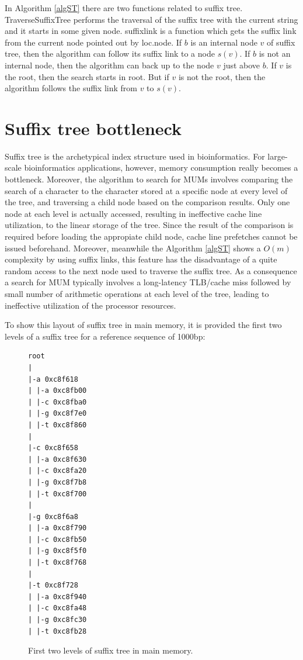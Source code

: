 \documentclass[conference]{IEEEtran}
\begin{document}
In Algorithm \ref{algST} there are two functions related to suffix tree. TraverseSuffixTree performs the traversal of the suffix tree with the current string  and it starts in some given node. suffixlink is a function which gets the suffix link from the current node pointed out by loc.node. If $b$ is an internal node $v$ of suffix tree, then the algorithm can follow its suffix link to a node $s(v)$. If $b$ is not an internal node, then the algorithm can back up to the node $v$ just above $b$. If $v$ is the root, then the search starts in root. But if $v$ is not the root, then the algorithm follows the suffix link from $v$ to $s(v)$.
\section{Suffix tree bottleneck}
Suffix tree is the archetypical index structure used in bioinformatics. For large-scale bioinformatics applications, however, memory consumption really becomes a bottleneck. Moreover, the algorithm to search for MUMs involves comparing the search of a character to the character stored at a specific node at every level of the tree, and traversing a child node based on the comparison results. Only one node at each level is actually accessed, resulting in ineffective cache line utilization, to the linear storage of the tree. Since the result of the comparison is required before loading the appropiate child node, cache line prefetches cannot be issued beforehand. Moreover, meanwhile the Algorithm \ref{algST} shows a $O(m)$ complexity by using suffix links, this feature has the disadvantage of a quite random access to the next node used to traverse the suffix tree. As a consequence a search for MUM typically involves a long-latency TLB/cache miss followed by small number of arithmetic operations at each level of the tree, leading to ineffective utilization of the processor resources.

To show this layout of suffix tree in main memory, it is provided the first two levels of a suffix tree for a reference sequence of 1000bp:
\begin{figure}
\begin{verbatim}
root
|
|-a 0xc8f618
| |-a 0xc8fb00
| |-c 0xc8fba0
| |-g 0xc8f7e0
| |-t 0xc8f860
|
|-c 0xc8f658
| |-a 0xc8f630
| |-c 0xc8fa20
| |-g 0xc8f7b8
| |-t 0xc8f700
|
|-g 0xc8f6a8
| |-a 0xc8f790
| |-c 0xc8fb50
| |-g 0xc8f5f0
| |-t 0xc8f768
|
|-t 0xc8f728
| |-a 0xc8f940
| |-c 0xc8fa48
| |-g 0xc8fc30
| |-t 0xc8fb28
\end{verbatim}
\label{stlayout}
\caption{First two levels of suffix tree in main memory.}
\end{figure}
\end{document}

